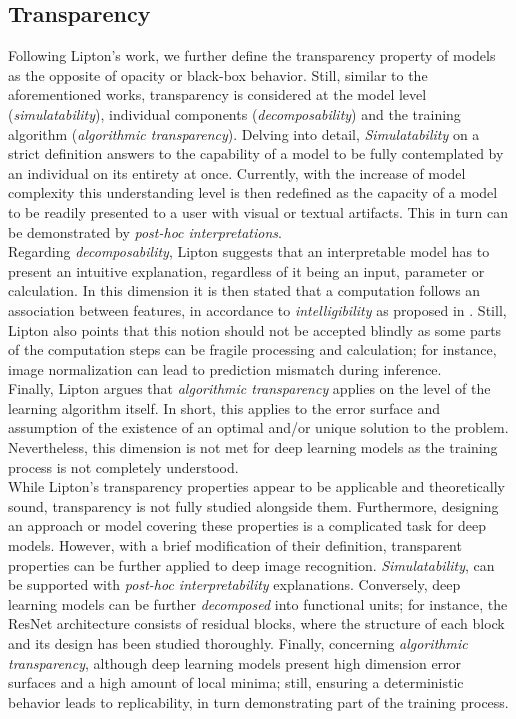 \subsection{Transparency}
\label{rel:sub_transp}
Following Lipton's work, we further define the transparency property of models as the opposite of 
opacity or black-box behavior. Still, similar to the aforementioned works, transparency is 
considered at the model level (\emph{simulatability}), individual components 
(\emph{decomposability}) and the training algorithm (\emph{algorithmic transparency}). Delving into 
detail, \emph{Simulatability} on a strict definition answers to the capability of a model to be 
fully contemplated by an individual on its entirety at once. Currently, with the increase of model 
complexity this understanding level is then redefined as the capacity of a model to be readily 
presented to a user with visual or textual artifacts. This in turn can be demonstrated by 
\emph{post-hoc interpretations}.\\

\noindent Regarding \emph{decomposability}, Lipton suggests that an interpretable model has to present 
an intuitive explanation, regardless of it being an input, parameter or calculation. In this 
dimension it is then stated that a computation follows an association between features, in 
accordance to \emph{intelligibility} as proposed in \autocite{lou2012intelligible}. Still, Lipton 
also points that this notion should not be accepted blindly as some parts of the computation steps 
can be fragile processing and calculation; for instance, image normalization can lead to prediction 
mismatch during inference.\\

\noindent Finally, Lipton argues that \emph{algorithmic transparency} applies on the level of the 
learning algorithm itself. In short, this applies to the error surface and assumption of the 
existence of an optimal and/or unique solution to the problem. Nevertheless, this dimension is not 
met for deep learning models as the training process is not completely understood.\\

\noindent While Lipton's transparency properties appear to be applicable and theoretically sound, 
transparency is not fully studied alongside them. Furthermore, designing an approach or 
model covering these properties is a complicated task for deep models. However, with a brief 
modification of their definition, transparent properties can be further applied to deep image 
recognition. \emph{Simulatability}, can be supported with \emph{post-hoc 
interpretability} explanations. Conversely, deep learning models can be further 
\emph{decomposed} into functional units; for instance, the ResNet architecture consists of
residual blocks, where the structure of each block and its design has been studied thoroughly. 
Finally, concerning \emph{algorithmic transparency}, although deep learning models present high 
dimension error surfaces and a high amount of local minima; still, ensuring a deterministic 
behavior leads to replicability, in turn demonstrating part of the training process.\\

